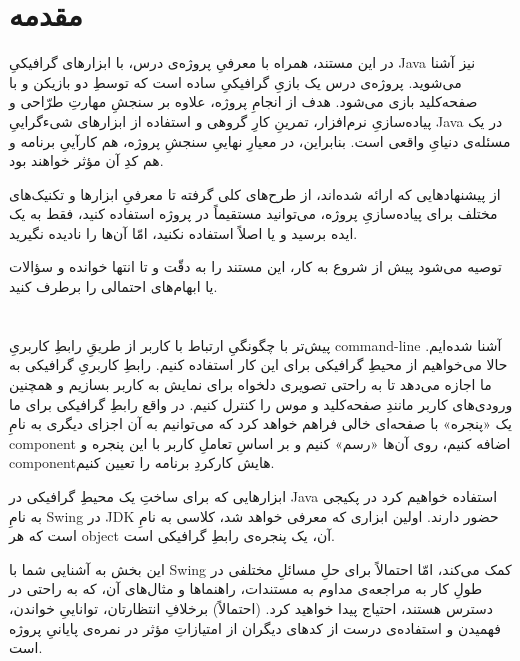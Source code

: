 \documentclass[a4paper,12pt]{paper}
\newcommand{\minti}[1]{\roundbox{\lr{\texttt{#1}}}}
\begin{document}
\renewcommand{\contentsname}{}
\tableofcontents

\section*{مقدمه}
در این مستند، همراه با معرفیِ پروژه‌ی درس، با ابزارهای گرافیکیِ {\en Java} نیز آشنا می‌شوید. پروژه‌ی درس یک بازیِ گرافیکیِ ساده است که توسطِ دو بازیکن و با صفحه‌کلید بازی می‌شود. هدف از انجامِ پروژه، علاوه بر سنجشِ مهارتِ طرّاحی و پیاده‌سازیِ نرم‌افزار، تمرینِ کارِ گروهی و استفاده‌  از ابزارهای شیء‌گراییِ {\en Java} در یک مسئله‌ی دنیایِ واقعی است. بنابراین، در معیارِ نهاییِ سنجشِ پروژه، هم کارآییِ برنامه و هم کدِ آن مؤثر خواهند بود.

از پیشنهادهایی که ارائه شده‌اند، از طرح‌های کلی گرفته تا معرفیِ ابزارها و تکنیک‌های مختلف برای پیاده‌سازیِ پروژه، می‌توانید مستقیماً در پروژه استفاده کنید، فقط به یک ایده برسید و یا اصلاً استفاده نکنید، امّا آن‌ها را نادیده نگیرید.

توصیه می‌شود پیش از شروع به کار، این مستند را به دقّت و تا انتها خوانده و سؤالات یا ابهام‌های احتمالی را برطرف کنید.

\section{}
پیش‌تر با چگونگیِ ارتباط با کاربر از طریقِ رابطِ کاربریِ {\en command-line} آشنا شده‌ایم. حالا می‌خواهیم از محیطِ گرافیکی برای این کار استفاده کنیم. رابطِ کاربریِ گرافیکی به ما اجازه می‌دهد تا به راحتی تصویری دلخواه برای نمایش به کاربر بسازیم و همچنین ورودی‌های کاربر مانندِ صفحه‌کلید و موس را کنترل کنیم. در واقع رابطِ گرافیکی برای ما یک «پنجره» با صفحه‌ای خالی فراهم خواهد کرد که می‌توانیم به آن اجزای دیگری به نامِ {\en component} اضافه کنیم، روی آن‌ها «رسم» کنیم و بر اساسِ تعاملِ کاربر با این پنجره و {\en component}هایش کارکردِ برنامه را تعیین کنیم.

ابزارهایی که برای ساختِ یک محیطِ گرافیکی در {\en Java} استفاده خواهیم کرد در پکیجی به نامِ {\en Swing} در {\en JDK} حضور دارند. اولین ابزاری که معرفی خواهد شد، کلاسی به نامِ \minti{JFrame} است که هر {\en object}ِ آن، یک پنجره‌ی رابطِ گرافیکی است.

\begin{attn}
	این بخش به آشنایی شما با {\en Swing} کمک می‌کند، امّا احتمالاً برای حلِ مسائلِ مختلفی در طولِ کار به مراجعه‌ی مداوم به مستندات، راهنماها و مثال‌های آن، که به راحتی در دسترس هستند، احتیاج پیدا خواهید کرد. (احتمالاً) برخلافِ انتظارتان، تواناییِ خواندن، فهمیدن و استفاده‌ی درست از کدهای دیگران از امتیازاتِ مؤثر در نمره‌ی پایانیِ پروژه است.
\end{attn}
\end{document}
